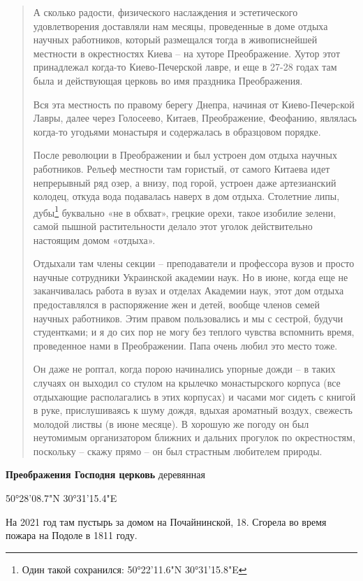 \begin{quotation}
А сколько радости, физического наслаждения и эстетического удовлетворения доставляли нам месяцы, проведенные в доме отдыха научных работников, который размещался тогда в живописнейшей местности в окрестностях Киева – на хуторе Преображение. Хутор этот принадлежал когда-то Киево-Печерской лавре, и еще в 27-28 годах там была и действующая церковь во имя праздника Преображения.

Вся эта местность по правому берегу Днепра, начиная от Киево-Печер­cкой Лавры, далее через Голосеево, Китаев, Преображение, Феофанию, являлась когда-то угодьями монастыря и содержалась в образцовом порядке. 

После революции в Преображении и был устроен дом отдыха научных работников. Рельеф местности там гористый, от самого Китаева идет непрерывный ряд озер, а внизу, под горой, устроен даже артезианский колодец, откуда вода подавалась наверх в дом отдыха. Столетние липы, дубы\footnote{Один такой сохранился: 50°22'11.6"N 30°31'15.8"E} буквально «не в обхват», грецкие орехи, такое изобилие зелени, самой пышной растительности делало этот уголок действительно настоящим домом «отдыха».

Отдыхали там члены секции – преподаватели и профессора вузов и просто научные сотрудники Украинской академии наук. Но в июне, когда еще не заканчивалась работа в вузах и отделах Академии наук, этот дом отдыха предоставлялся в распоряжение жен и детей, вообще членов семей научных работников. Этим правом пользовались и мы с сестрой, будучи студентками; и я до сих пор не могу без теплого чувства вспомнить время, проведенное нами в Преображении. Папа очень любил это место тоже. 

Он даже не роптал, когда порою начинались упорные дожди – в таких случаях он выходил со стулом на крылечко монастырского корпуса (все отдыхающие располагались в этих корпусах) и часами мог сидеть с книгой в руке, прислушиваясь к шуму дождя, вдыхая ароматный воздух, свежесть молодой листвы (в июне месяце). В хорошую же погоду он был неутомимым организатором ближних и дальних прогулок по окрестностям, поскольку – скажу прямо – он был страстным любителем природы.
\end{quotation}

\medskip

\textbf{Преображения Господня церковь} деревянная

50°28'08.7"N 30°31'15.4"E

На 2021 год там пустырь за домом на Почайнинской, 18. Сгорела во время пожара на Подоле в 1811 году.\\ 

